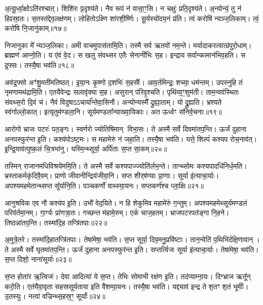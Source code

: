 अ॒त्यू॒र्ध्वा॒क्षोऽति॑रश्चात्। शिशि॑रः प्र॒दृश्य॑ते। 
नैव रूपं न॑ वासा॒ꣳ॒सि। न चक्षुः॑ प्रति॒दृश्य॑ते। 
अ॒न्योन्यं॒ तु न॑ हिꣴस्रा॒तः। स॒तस्त॑द्देव॒लक्ष॑णम्। 
लोहितोऽक्ष्णि शा॑रशी॒र्ष्णिः। सू॒र्यस्यो॑दय॒नं प्र॑ति। 
त्वं करोषि॑ न्यञ्ज॒लिकाम्। त्वं॒ करो॑षि नि॒जानु॑काम्॥१७॥

निजानुका मे᳚ न्यञ्ज॒लिका। अमी वाचमुपास॑तामि॒ति। 
तस्मै सर्व ऋतवो॑ नम॒न्ते। मर्यादाकरत्वात्प्र॑\-पुरो॒धाम्। 
ब्राह्मण॑ आप्नो॒ति। य ए॑वं वे॒द। स खलु संवथ्सर एतैः सेनानी॑भिः स॒ह। 
इन्द्राय सर्वान्कामान॑भिव॒हति। स द्र॒फ्सः। तस्यै॒षा भव॑ति॥१८॥

अव॑द्र॒फ्सो अꣳ॑शु॒मती॑मतिष्ठत्। इ॒या॒नः कृ॒ष्णो द॒शभिः॑ स॒हस्रैः᳚। 
आव॒र्तमिन्द्रः॒ शच्या॒ धम॑न्तम्। उपस्नुहि तं नृमणामथ॑द्रामि॒ति। 
एतयैवेन्द्रः सलावृ॑क्या स॒ह। असुरान्‌ प॑रिवृ॒श्चति। 
पृथि॑व्य॒ꣳ॒शुम॑ती। ताम॒न्वव॑स्थितः संवथ्स॒रो दि॒वं च॑। 
नैवं विदुषाऽऽचार्या᳚न्तेवा॒सिनौ। अन्योन्यस्मै᳚ द्रुह्या॒ताम्। यो द्रु॒ह्यति। 
भ्रश्यते स्व॑र्गाल्लो॒कात्। इत्यृतुम॑ण्डला॒नि। 
सूर्यमण्डला᳚न्या\-ख्या॒यिकाः। अत ऊर्ध्वꣳ स॑निर्व॒चनाः॥१९॥\anuvakamend


आरोगो भ्राजः पटरः॑ पत॒ङ्गः। स्वर्णरो ज्योतिषिमान् विभा॒सः। 
ते अस्मै सर्वे दिवमा॑तप॒न्ति। ऊर्जं दुहाना अनपस्फुर॑न्त इ॒ति। 
कश्य॑पोऽष्ट॒मः। स महामेरुं न॑ जहा॒ति। 
तस्यै॒षा भव॑ति। यत्ते॒ शिल्पं॑ कश्यप रोच॒नाव॑त्। 
इ॒न्द्रि॒याव॑त्पुष्क॒लं चि॒त्रभा॑नु। यस्मि॒न्थ्सूर्या॒ अर्पि॑ताः स॒प्त सा॒कम्॥२०॥

तस्मिन्‌ राजानमधिविश्रये॑ममि॒ति। ते अस्मै सर्वे कश्यपाज्ज्यो\-ति॑र्लभ॒न्ते। 
तान्थ्सोमः कश्यपादधि॑निर्ध॒मति। भ्रस्ताकर्मकृ॑दिवै॒वम्। 
प्राणो जीवानीन्द्रिय॑जीवा॒नि। सप्त शीर्‌ष॑ण्याः प्रा॒णाः। 
सूर्या इ॑त्याचा॒र्याः। अपश्यमहमेतान्थ्सप्त सू᳚र्यानि॒ति। 
पञ्च\-कर्णो॑ वाथ्स्या॒यनः। सप्तकर्ण॑श्च प्ला॒क्षिः॥२१॥

आनुश्रविक एव नौ कश्य॑प इ॒ति। उभौ॑ वेद॒यिते। 
न हि शेकुमिव महामे॑रुं ग॒न्तुम्। अपश्यमहमेथ्सूर्यमण्डलं परिव॑र्तमा॒नम्। 
गा॒र्ग्यः प्रा॑णत्रा॒तः। गच्छन्त म॑हामे॒रुम्। एकं॑ चाज॒हतम्। 
भ्राजपटरपत॑ङ्गा नि॒हने। तिष्ठन्ना॑तप॒न्ति। तस्मा॑दि॒ह तप्त्रि॑तपाः॥२२॥

अ॒मुत्रे॒तरे। तस्मा॑दि॒हातप्त्रि॑तपाः। तेषा॑मेषा॒ भव॑ति। 
स॒प्त सूर्या॒ दिव॒मनु॒प्रवि॑ष्टाः। तान॒न्वेति॑ प॒थिभि॑र्दक्षि॒णावान्। 
ते अस्मै सर्वे घृतमा॑तप॒न्ति। ऊर्जं दुहाना अनपस्फुर॑न्त इ॒ति। 
सप्तर्त्विजः सूर्या इ॑त्याचा॒र्याः। तेषा॑मेषा॒ भव॑ति। स॒प्त दिशो॒ नाना॑सूर्याः॥२३॥

स॒प्त होता॑र ऋ॒त्विजः॑। देवा आदित्या॑ ये स॒प्त। 
तेभिः सोमाभी रक्ष॑ण इ॒ति। तद॑प्याम्ना॒यः। 
दिग्भ्राज ऋतू᳚न्‌ करो॒ति। एत॑यैवा॒वृता सहस्रसूर्यताया इति वै॑शम्पा॒यनः। 
तस्यै॒षा भव॑ति। यद्द्याव॑ इन्द्र ते श॒तꣳ श॒तं भूमीः᳚। 
उ॒तस्युः। नत्वा॑ वज्रिन्थ्स॒हस्र॒ꣳ॒ सूर्याः᳚॥२४॥

